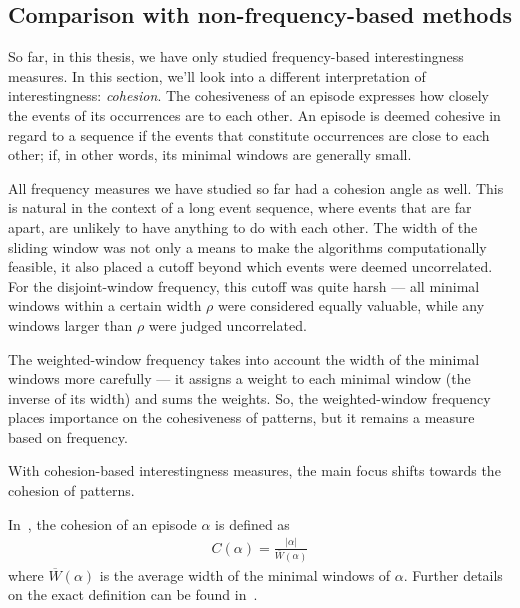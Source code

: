 \subsection{Comparison with non-frequency-based methods}

\iffalse
As we saw in Section~\ref{sec:experiments-quality-episodes}, anti-monotonic frequency measures inherently put larger episodes at a disadvantage, since an episode is never more frequent than any of its subepisodes.
\fi

So far, in this thesis, we have only studied frequency-based interestingness measures. In this section, we'll look into a different interpretation of interestingness: \emph{cohesion}. The cohesiveness of an episode expresses how closely the events of its occurrences are to each other. An episode is deemed cohesive in regard to a sequence if the events that constitute occurrences are close to each other; if, in other words, its minimal windows are generally small.

All frequency measures we have studied so far had a cohesion angle as well. This is natural in the context of a long event sequence, where events that are far apart, are unlikely to have anything to do with each other. The width of the sliding window was not only a means to make the algorithms computationally feasible, it also placed a cutoff beyond which events were deemed uncorrelated. For the disjoint-window frequency, this cutoff was quite harsh --- all minimal windows within a certain width $ \rho $ were considered equally valuable, while any windows larger than $ \rho $ were judged uncorrelated.

The weighted-window frequency takes into account the width of the minimal windows more carefully --- it assigns a weight to each minimal window (the inverse of its width) and sums the weights. So, the weighted-window frequency places importance on the cohesiveness of patterns, but it remains a measure based on frequency.

With cohesion-based interestingness measures, the main focus shifts towards the cohesion of patterns.

In~\cite{cule2016efficient}, the cohesion of an episode $ \alpha $ is defined as
\begin{align*}
C(\alpha) = \frac{| \alpha |}{\overline{W}(\alpha)}
\end{align*}
where $ \overline{W}(\alpha) $ is the average width of the minimal windows of $ \alpha $. Further details on the exact definition can be found in~\cite{cule2016efficient}.

